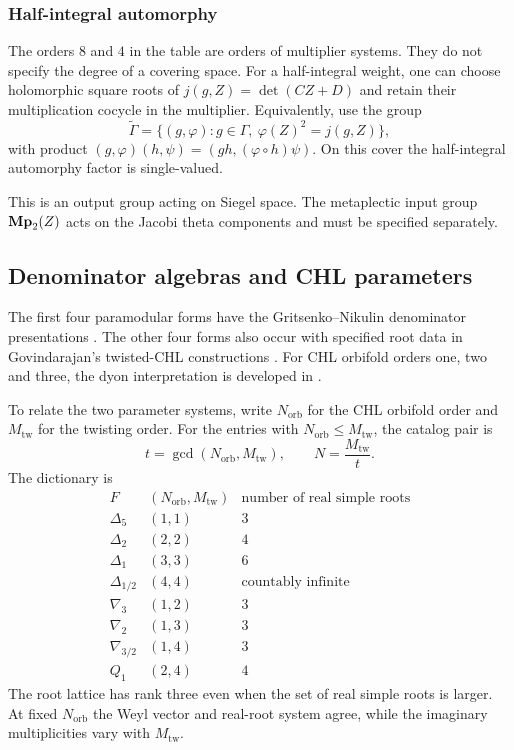 \subsubsection{Half-integral automorphy}
The orders \(8\) and \(4\) in the table are orders of multiplier
systems.  They do not specify the degree of a covering space.
For a half-integral weight, one can choose holomorphic square roots
of \(j(g,Z)=\det(CZ+D)\) and retain their multiplication cocycle
in the multiplier.  Equivalently, use the group
\[
 \widetilde\Gamma
 =\{(g,\varphi):g\in\Gamma,\ \varphi(Z)^2=j(g,Z)\},
\]
with product
\((g,\varphi)(h,\psi)=(gh,(\varphi\circ h)\psi)\).
On this cover the half-integral automorphy factor is single-valued.

This is an output group acting on Siegel space.
The metaplectic input group \(\mathbf{Mp}_2(Z)\) acts on the Jacobi
theta components and must be specified separately.

\subsection{Denominator algebras and CHL parameters}

The first four paramodular forms have the
Gritsenko--Nikulin denominator presentations
\cite[\S5.1.1]{GNII}.
The other four forms also occur with specified root data in
Govindarajan's twisted-CHL constructions
\cite[\S4 and Table 3]{Gov11BKM}.
For CHL orbifold orders one, two and three, the dyon interpretation
is developed in \cite{CD09BKM}.

To relate the two parameter systems, write \(N_{\mathrm{orb}}\)
for the CHL orbifold order and \(M_{\mathrm{tw}}\) for the
twisting order.  For the entries with
\(N_{\mathrm{orb}}\leq M_{\mathrm{tw}}\), the catalog pair is
\[
 t=\gcd(N_{\mathrm{orb}},M_{\mathrm{tw}}),\qquad
 N=\frac{M_{\mathrm{tw}}}{t}.
\]
The dictionary is
\[
\begin{array}{c|c|c}
 F&(N_{\mathrm{orb}},M_{\mathrm{tw}})
       &\text{number of real simple roots}\\ \hline
 \Delta_5&(1,1)&3\\
 \Delta_2&(2,2)&4\\
 \Delta_1&(3,3)&6\\
 \Delta_{1/2}&(4,4)&\text{countably infinite}\\
 \nabla_3&(1,2)&3\\
 \nabla_2&(1,3)&3\\
 \nabla_{3/2}&(1,4)&3\\
 Q_1&(2,4)&4
\end{array}
\]
The root lattice has rank three even when the set of real simple
roots is larger.  At fixed \(N_{\mathrm{orb}}\) the Weyl
vector and real-root system agree, while the imaginary
multiplicities vary with \(M_{\mathrm{tw}}\).

